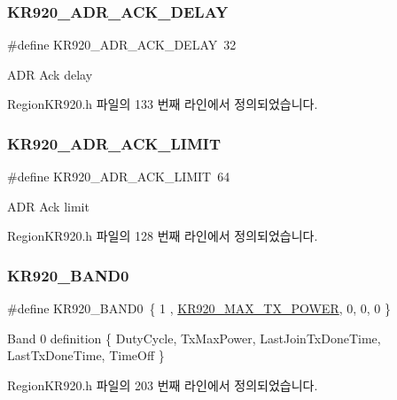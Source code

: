 \subsubsection{\texorpdfstring{K\+R920\+\_\+\+A\+D\+R\+\_\+\+A\+C\+K\+\_\+\+D\+E\+L\+AY}{KR920\_ADR\_ACK\_DELAY}}
{\footnotesize\ttfamily \#define K\+R920\+\_\+\+A\+D\+R\+\_\+\+A\+C\+K\+\_\+\+D\+E\+L\+AY~32}

A\+DR Ack delay 

Region\+K\+R920.\+h 파일의 133 번째 라인에서 정의되었습니다.

\mbox{\label{group___r_e_g_i_o_n_k_r920_ga6950b0a2c12046467e541efc0738c58c}} 
\subsubsection{\texorpdfstring{K\+R920\+\_\+\+A\+D\+R\+\_\+\+A\+C\+K\+\_\+\+L\+I\+M\+IT}{KR920\_ADR\_ACK\_LIMIT}}
{\footnotesize\ttfamily \#define K\+R920\+\_\+\+A\+D\+R\+\_\+\+A\+C\+K\+\_\+\+L\+I\+M\+IT~64}

A\+DR Ack limit 

Region\+K\+R920.\+h 파일의 128 번째 라인에서 정의되었습니다.

\mbox{\label{group___r_e_g_i_o_n_k_r920_ga1bb003b2b2b3a0b0fae035b8e0aa58e5}} 
\subsubsection{\texorpdfstring{K\+R920\+\_\+\+B\+A\+N\+D0}{KR920\_BAND0}}
{\footnotesize\ttfamily \#define K\+R920\+\_\+\+B\+A\+N\+D0~\{ 1 , \mbox{\hyperlink{group___r_e_g_i_o_n_k_r920_ga83f7aad24311983622b179a74c3c80d0}{K\+R920\+\_\+\+M\+A\+X\+\_\+\+T\+X\+\_\+\+P\+O\+W\+ER}}, 0, 0, 0 \}}

Band 0 definition \{ Duty\+Cycle, Tx\+Max\+Power, Last\+Join\+Tx\+Done\+Time, Last\+Tx\+Done\+Time, Time\+Off \} 

Region\+K\+R920.\+h 파일의 203 번째 라인에서 정의되었습니다.


